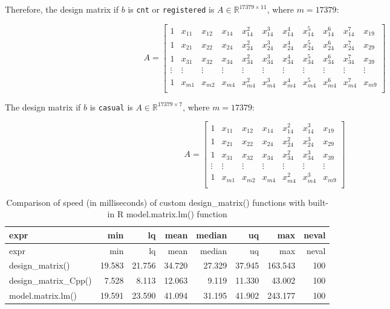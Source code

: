 \documentclass[
]{article}
\begin{document}
Therefore, the design matrix if \(b\) is \texttt{cnt} or
\texttt{registered} is \(A \in \mathbb{R}^{17379 \times 11}\), where
\(m = 17379\):

\[
A=
  \begin{bmatrix}
    1 & x_{11} & x_{12} & x_{14} & x_{14}^{2} & x_{14}^{3} & x_{14}^{4} & x_{14}^{5} & x_{14}^{6} & x_{14}^{7} & x_{19} \\
    1 & x_{21} & x_{22} & x_{24} & x_{24}^{2} & x_{24}^{3} & x_{24}^{4} & x_{24}^{5} & x_{24}^{6} & x_{24}^{7} & x_{29} \\
    1 & x_{31} & x_{32} & x_{34} & x_{34}^{2} & x_{34}^{3} & x_{34}^{4} & x_{34}^{5} & x_{34}^{6} & x_{34}^{7} & x_{39} \\
    \vdots & \vdots & \vdots & \vdots & \vdots & \vdots & \vdots & \vdots & \vdots & \vdots & \vdots \\
    1 & x_{m1} & x_{m2} & x_{m4} & x_{m4}^{2} & x_{m4}^{3} & x_{m4}^{4} & x_{m4}^{5} & x_{m4}^{6} & x_{m4}^{7} & x_{m9} \\
  \end{bmatrix} 
\]

The design matrix if \(b\) is \texttt{casual} is
\(A \in \mathbb{R}^{17379 \times 7}\), where \(m = 17379\):

\[
A=
  \begin{bmatrix}
    1 & x_{11} & x_{12} & x_{14} & x_{14}^{2} & x_{14}^{3} & x_{19} \\
    1 & x_{21} & x_{22} & x_{24} & x_{24}^{2} & x_{24}^{3} & x_{29} \\
    1 & x_{31} & x_{32} & x_{34} & x_{34}^{2} & x_{34}^{3} & x_{39} \\
    \vdots & \vdots & \vdots & \vdots & \vdots & \vdots & \vdots  \\
    1 & x_{m1} & x_{m2} & x_{m4} & x_{m4}^{2} & x_{m4}^{3} & x_{m9} \\
  \end{bmatrix} 
\]

\begin{longtable}[]{@{}lrrrrrrr@{}}
\caption{Comparison of speed (in milliseconds) of custom
design\_matrix() functions with built-in R model.matrix.lm()
function}\tabularnewline
\toprule
expr & min & lq & mean & median & uq & max & neval\tabularnewline
\midrule
\endfirsthead
\toprule
expr & min & lq & mean & median & uq & max & neval\tabularnewline
\midrule
\endhead
design\_matrix() & 19.583 & 21.756 & 34.720 & 27.329 & 37.945 & 163.543
& 100\tabularnewline
design\_matrix\_Cpp() & 7.528 & 8.113 & 12.063 & 9.119 & 11.330 & 43.002
& 100\tabularnewline
model.matrix.lm() & 19.591 & 23.590 & 41.094 & 31.195 & 41.902 & 243.177
& 100\tabularnewline
\bottomrule
\end{longtable}
\end{document}
